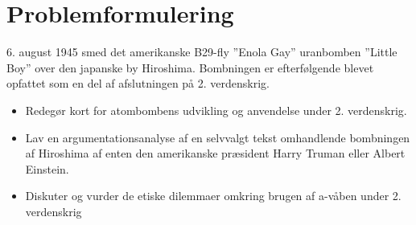 \section{Problemformulering}\label{sec:Problemformulering}
6. august 1945 smed det amerikanske B29-fly ”Enola Gay” uranbomben ”Little Boy” over den japanske by
Hiroshima. Bombningen er efterfølgende blevet opfattet som en del af afslutningen på 2. verdenskrig.
\begin{itemize}
    \item Redegør kort for atombombens udvikling og anvendelse under 2. verdenskrig.
    \item Lav en argumentationsanalyse af en selvvalgt tekst omhandlende bombningen af Hiroshima af enten
    den amerikanske præsident Harry Truman eller Albert Einstein.
    \item Diskuter og vurder de etiske dilemmaer omkring brugen af a-våben under 2. verdenskrig
\end{itemize}
\newpage